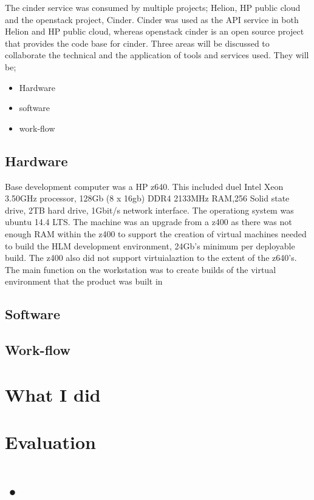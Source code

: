 \documentclass[11pt,a4paper]{report}
\begin{document}
The cinder service was consumed by multiple projects; Helion, HP public cloud and the openstack project, Cinder. Cinder was used as the API service in both Helion and HP public cloud, whereas openstack cinder is an open source project that provides the code base for cinder. Three areas will be discussed to collaborate the technical and the application of tools and services used. They will be;

\begin{itemize}
\item Hardware
\item software
\item work-flow
\end{itemize} 

\subsection{Hardware}
Base development computer was a HP z640. This included duel Intel Xeon 3.50GHz processor, 128Gb (8 x 16gb) DDR4 2133MHz RAM,256 Solid state drive, 2TB hard drive, 1Gbit/s network interface. The operationg system was ubuntu 14.4 LTS. The machine was an upgrade from a z400 as there was not enough RAM within the z400 to support the creation of virtual machines needed to build the HLM development environment, 24Gb's minimum per deployable build. The z400 also did not support virtuialaztion  to the extent of the z640's. The main function on the workstation was to create builds of the virtual environment that the product was built in  

\subsection{Software}

\subsection{Work-flow}


\section{What I did}



\section{Evaluation}



\section{•}
\end{document}
